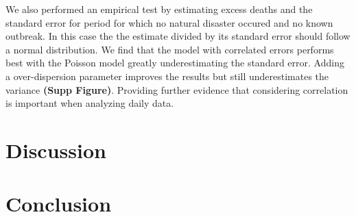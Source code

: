 \documentclass[11pt]{article}
\begin{document}

We also performed an empirical test by estimating excess deaths and the standard error for period for which no natural disaster occured and no known outbreak. In this case the the estimate divided by its standard error should follow a normal distribution.  We find that the model with correlated errors performs best with the Poisson model greatly underestimating the standard error. Adding a over-dispersion parameter improves the results but still underestimates the variance \textbf{(Supp Figure)}. Providing further evidence that considering correlation is important when analyzing daily data.

\section{Discussion}

\section{Conclusion}

 
\end{document}
